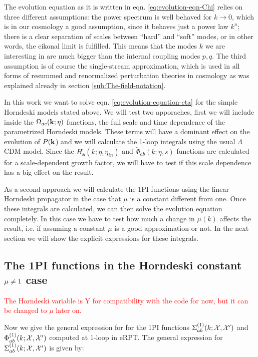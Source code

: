 The evolution equation as it is written in eqn. \ref{eq:evolution-eqn-Chi}
relies on three different assumptions: the power spectrum is well
behaved for $k\rightarrow0$, which is in our cosmology a good assumption,
since it behaves just a power law $k^{n}$; there is a clear separation
of scales between ``hard'' and ``soft'' modes, or in other words,
the eikonal limit is fulfilled. This means that the modes $k$ we
are interesting in are much bigger than the internal coupling modes
$p,q$. The third assumption is of course the single-stream approximation,
which is used in all forms of resummed and renormalized perturbation
theories in cosmology as was explained already in section \ref{sub:The-field-notation}.

In this work we want to solve eqn. \ref{eq:evolution-equation-eta}
for the simple Horndeski models stated above. We will test two apporaches,
first we will include inside the $\Omega_{ac}(\mathbf{k};\eta)$ functions, the
full scale and time dependence of the parametrized Horndeski models.
These terms will have a dominant effect on the evolution of $P(\mathbf{k}$)
and we will calculate the 1-loop integrals using the usual $\Lambda$CDM
model. Since the $H_{\mathbf{a}}(k;\eta,\eta_{in})$ and $\tilde{\Phi}_{ab}(k;\mathcal{\eta},s)$
functions are calculated for a scale-dependent growth factor, we will
have to test if this scale dependence has a big effect on the result.

As a second approach we will calculate the 1PI functions using the
linear Horndeski propagator in the case that $\mu$ is a constant
different from one. Once these integrals are calculated, we can then
solve the evolution equation completely. In this case we have to test
how much a change in $\mu(k)$ affects the result, i.e. if assuming
a constant $\mu$ is a good approximation or not. In the next section
we will show the explicit expressions for these integrals.


\subsection{The 1PI functions in the Horndeski constant $\mu\protect\neq1$ case}

\textcolor{red}{The Horndeski variable is Y for compatibility
with the code for now, but it can be changed to $\mu$ later on.}

Now we give the general expression for for the 1PI functions $\Sigma_{ab}^{(1)}(k;\mathcal{X},\mathcal{X}')$
and $\Phi_{ab}^{(1)}(k;\mathcal{X},\mathcal{X}')$ computed at 1-loop in eRPT.
The general expression for $\Sigma_{ab}^{(1)}(k;\mathcal{X},\mathcal{X}')$
is given by:

